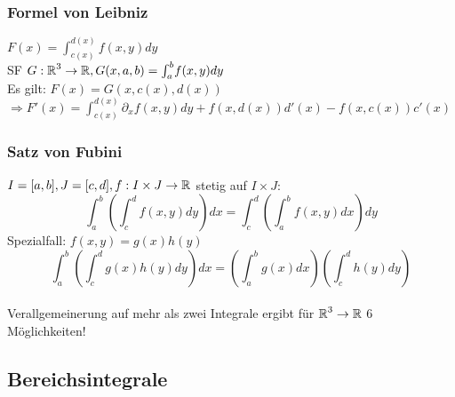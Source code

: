 \documentclass[german]{latex4ei/latex4ei_sheet}
\begin{document}
\subsubsection{Formel von Leibniz}
$F(x)=\int_{c(x)}^{d(x)} \! f(x,y) d y$\\
SF $G: \operatorname{\mathbb R}^3 \to \operatorname{\mathbb R}, G(x,a,b)=\int_a^b \! f(x,y) d y$\\
Es gilt: $F(x)=G(x,c(x),d(x))$\\
$\Rightarrow F'(x)=\int_{c(x)}^{d(x)} \! \partial_x f(x,y) d y + f(x,d(x)) d'(x) - f(x,c(x))c'(x)$

\subsubsection{Satz von Fubini}
$I=[a,b],J=[c,d], f:I \times J \to \operatorname{\mathbb R}$ stetig auf $I \times J$:
\[\int_a^b (\int_c^d f(x,y) d y)d x=\int_c^d (\int_a^b f(x,y) d x)d y\]
Spezialfall: $f(x,y)=g(x)h(y)$
\[\int_a^b(\int_c^d g(x)h(y) d y) d x=(\int_a^b g(x) d x)(\int_c^d h(y) d y)\]\\
Verallgemeinerung auf mehr als zwei Integrale ergibt f\"ur $\operatorname{\mathbb R}^3 \to \operatorname{\mathbb R}$ 6 M\"oglichkeiten!

\subsection{Bereichsintegrale}
\end{document}
